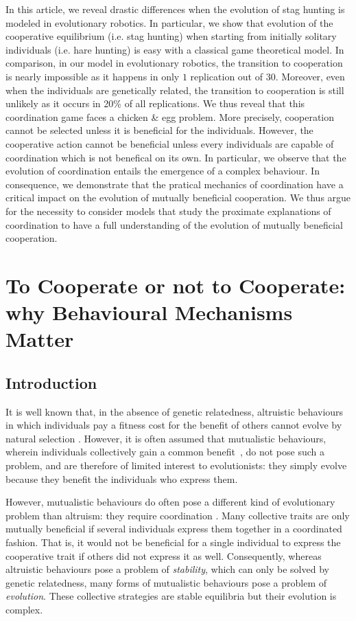 In this article, we reveal drastic differences when the evolution of stag hunting is modeled in evolutionary robotics. In particular, we show that evolution of the cooperative equilibrium (i.e. stag hunting) when starting from initially solitary individuals (i.e. hare hunting) is easy with a classical game theoretical model. In comparison, in our model in evolutionary robotics, the transition to cooperation is nearly impossible as it happens in only $1$ replication out of $30$. Moreover, even when the individuals are genetically related, the transition to cooperation is still unlikely as it occurs in 20\% of all replications. We thus reveal that this coordination game faces a chicken \& egg problem. More precisely, cooperation cannot be selected unless it is beneficial for the individuals. However, the cooperative action cannot be beneficial unless every individuals are capable of coordination which is not benefical on its own. In particular, we observe that the evolution of coordination entails the emergence of a complex behaviour. In consequence, we demonstrate that the pratical mechanics of coordination have a critical impact on the evolution of mutually beneficial cooperation. We thus argue for the necessity to consider models that study the proximate explanations of coordination to have a full understanding of the evolution of mutually beneficial cooperation.


\section{To Cooperate or not to Cooperate: why Behavioural Mechanisms Matter}
  \subsection{Introduction}
    It is well known that, in the absence of genetic relatedness, altruistic behaviours in which individuals pay a fitness cost for the benefit of others cannot evolve by natural selection \parencite{Hamilton1964,West2007a}. However, it is often assumed that mutualistic behaviours, wherein individuals collectively gain a common benefit~\parencite{Leimar2003, Leimar2010}, do not pose such a problem, and are therefore of limited interest to evolutionists: they simply evolve because they benefit the individuals who express them.

    However, mutualistic behaviours do often pose a different kind of evolutionary problem than altruism: they require coordination \parencite{Alvard1999, Alvard2003, Drea2009, Leimar2003}. Many collective traits are only mutually beneficial if several individuals express them together in a coordinated fashion. That is, it would not be beneficial for a single individual to express the cooperative trait if others did not express it as well. Consequently, whereas altruistic behaviours pose a problem of \textit{stability}, which can only be solved by genetic relatedness, many forms of mutualistic behaviours pose a problem of \textit{evolution}. These collective strategies are stable equilibria but their evolution is complex. 

